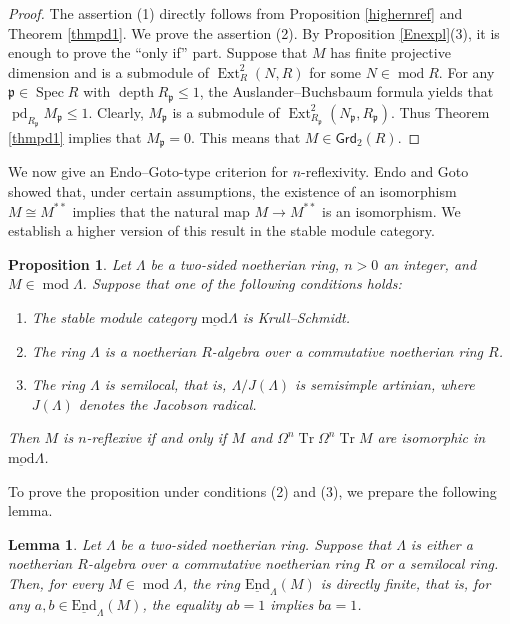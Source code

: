 \documentclass{amsart}
\newtheorem{lem}[thm]{Lemma}
\newtheorem{prop}[thm]{Proposition}
\theoremstyle{definition}
\theoremstyle{remark}
\numberwithin{equation}{thm}
\def\depth{\operatorname{depth}}
\def\Ext{\operatorname{Ext}}
\def\Endl{\operatorname{\underline{End}}}
\def\grd{\mathsf{Grd}}
\def\le{\leqslant}
\def\lmod{\operatorname{\underline{mod}}}
\def\mod{\operatorname{mod}}
\def\p{\mathfrak{p}}
\def\pd{\operatorname{pd}}
\def\spec{\operatorname{Spec}}
\def\syz{\Omega}
\def\tr{\operatorname{Tr}}
\begin{document}
\begin{proof}
The assertion (1) directly follows from Proposition \ref{highernref} and Theorem \ref{thmpd1}.
We prove the assertion (2). By Proposition \ref{Enexpl}(3), it is enough to prove the ``only if'' part.
Suppose that $M$ has finite projective dimension and is a submodule of $\Ext^2_R(N,R)$ for some $N\in\mod R$.
For any $\p\in\spec R$ with $\depth R_\p\le1$, the Auslander--Buchsbaum formula yields that $\pd_{R_\p}M_\p\le 1$.
Clearly, $M_\p$ is a submodule of $\Ext^2_{R_\p}(N_\p,R_\p)$.
Thus Theorem \ref{thmpd1} implies that $M_\p=0$.
This means that $M\in\grd_2(R)$.
\end{proof}

We now give an Endo--Goto-type criterion for $n$-reflexivity.
Endo and Goto \cite{EGref} showed that, under certain assumptions, the existence of an isomorphism $M\cong M^{\ast\ast}$ implies that the natural map $M\to M^{\ast\ast}$ is an isomorphism.
We establish a higher version of this result in the stable module category.

\begin{prop}\label{EGtypenref}
Let $\Lambda$ be a two-sided noetherian ring, $n>0$ an integer, and $M\in\mod\Lambda$.
Suppose that one of the following conditions holds:
\begin{enumerate}[\rm(1)]
   \item The stable module category $\lmod\Lambda$ is Krull--Schmidt.
   \item The ring $\Lambda$ is a noetherian $R$-algebra over a commutative noetherian ring $R$.
   \item The ring $\Lambda$ is semilocal, that is, $\Lambda/J(\Lambda)$ is semisimple artinian, where $J(\Lambda)$ denotes the Jacobson radical.
\end{enumerate}
Then $M$ is $n$-reflexive if and only if $M$ and $\syz^n\tr\syz^n\tr M$ are isomorphic in $\lmod\Lambda$.
\end{prop}

To prove the proposition under conditions (2) and (3), we prepare the following lemma.

\begin{lem}\label{directfinite}
Let $\Lambda$ be a two-sided noetherian ring.
Suppose that $\Lambda$ is either a noetherian $R$-algebra over a commutative noetherian ring $R$ or a semilocal ring.
Then, for every $M\in\mod\Lambda$, the ring $\Endl_\Lambda(M)$ is {\em directly finite}, that is, for any $a,b\in\Endl_\Lambda(M)$, the equality $ab=1$ implies $ba=1$.
\end{lem}
\end{document}
